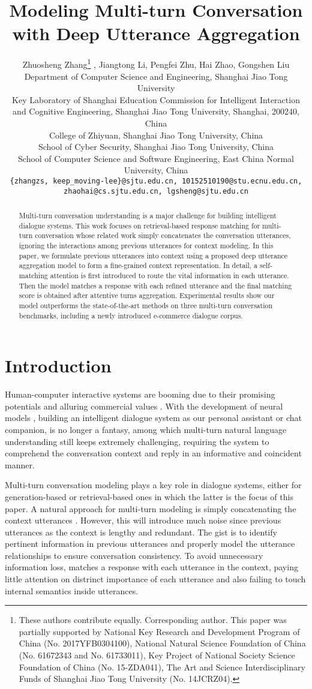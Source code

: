 \documentclass[11pt]{article}
\title{Modeling Multi-turn Conversation with Deep Utterance Aggregation}
\author{Zhuosheng Zhang\thanks{ These authors contribute equally.  Corresponding author. This paper was partially supported by
		National Key Research and Development Program of China (No. 2017YFB0304100),
		National Natural Science Foundation of China (No. 61672343 and No. 61733011),
		Key Project of National Society Science Foundation of China (No. 15-ZDA041),
		The Art and Science Interdisciplinary Funds of Shanghai Jiao Tong University (No. 14JCRZ04).} , Jiangtong Li, Pengfei Zhu, Hai Zhao, Gongshen Liu\\
	Department of Computer Science and Engineering, Shanghai Jiao Tong University \\
	Key Laboratory of Shanghai Education Commission for Intelligent Interaction \\ and Cognitive Engineering, Shanghai Jiao Tong University, Shanghai, 200240, China\\
	College of Zhiyuan, Shanghai Jiao Tong University, China\\
	School of Cyber Security, Shanghai Jiao Tong University, China\\
	School of Computer Science and Software Engineering, East China Normal University, China\\
	{\tt \{zhangzs, keep\_moving-lee\}@sjtu.edu.cn, 10152510190@stu.ecnu.edu.cn,} \\ {\tt zhaohai@cs.sjtu.edu.cn, lgsheng@sjtu.edu.cn}
}
\date{}
\begin{document}
\maketitle
\begin{abstract}

Multi-turn conversation understanding is a major challenge for building intelligent dialogue systems. This work focuses on retrieval-based response matching for multi-turn conversation whose related work simply concatenates the conversation utterances, ignoring the interactions among previous utterances for context modeling. In this paper, we formulate previous utterances into context using a proposed deep utterance aggregation model to form a fine-grained context representation. In detail, a self-matching attention is first introduced to route the vital information in each utterance. Then the model matches a response with each refined utterance and the final matching score is obtained after attentive turns aggregation. Experimental results show our model outperforms the state-of-the-art methods on three multi-turn conversation benchmarks, including a newly introduced e-commerce dialogue corpus.

\end{abstract}

\section{Introduction}



Human-computer interactive systems are booming due to their promising potentials and alluring commercial values \cite{Qiu2017AliMe,Cui2017SuperAgent,Zhao17,Huang2018Moon,Jia2014A}. With the development of neural models \cite{Zhang2018Neural,He2018Syntax,li2018Seq,Cai2018Seq,zhang2018OneShot}, building an intelligent dialogue system as our personal assistant or chat companion, is no longer a fantasy, among which multi-turn natural language understanding still keeps extremely challenging, requiring the system to comprehend the conversation context and reply in an informative and coincident manner.

Multi-turn conversation modeling plays a key role in dialogue systems, either for generation-based \cite{iulian17,iulian17-2,ganbin17,Wu2017Neural} or retrieval-based ones \cite{Wu2016Sequential,Zhou2016Multi} in which the latter is the focus of this paper. A natural approach for multi-turn modeling is simply concatenating the context utterances \cite{Lowe2015The,yan2016Learning}. However, this will introduce much noise since previous utterances as the context is lengthy and redundant. The gist is to identify pertinent information in previous utterances and properly model the utterance relationships to ensure conversation consistency. To avoid unnecessary information loss, \cite{Wu2016Sequential} matches a response with each utterance in the context, paying little attention on distrinct importance of each utterance and also failing to touch internal semantics inside utterances.
\end{document}

